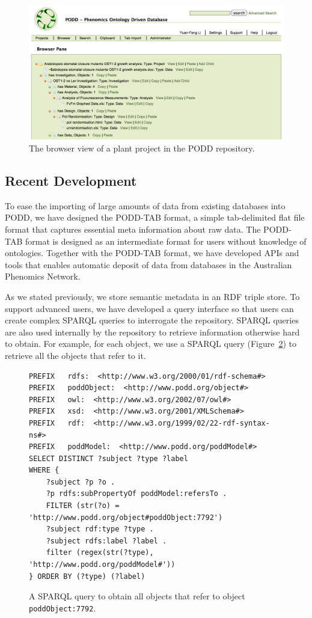 \documentclass[preprint,12pt]{elsarticle}
\begin{document}
\begin{figure}[htb]
\centering
\includegraphics[width=120mm]{browser.png}
\vspace{-8pt} 
\caption{The browser view of a plant project in the PODD repository.}\label{fig:browser}
\end{figure}

\subsection{Recent Development}
To ease the importing of large amounts of data from existing databases into PODD, we have designed the PODD-TAB format, a simple tab-delimited flat file format that captures essential meta information about raw data. The PODD-TAB format is designed as an intermediate format for users without knowledge of ontologies. Together with the PODD-TAB format, we have developed APIs and tools that enables automatic deposit of data from databases in the Australian Phenomics Network. 

As we stated previously, we store semantic metadata in an RDF triple store. To support advanced users, we have developed a query interface so that users can create complex SPARQL queries to interrogate the repository. SPARQL queries are also used internally by the repository to retrieve information otherwise hard to obtain. For example, for each object, we use a SPARQL query (Figure~\ref{fig:query}) to retrieve all the objects that refer to it. 

\begin{figure}[htb]
\footnotesize\centering
\begin{minipage}{.9\textwidth}
\begin{verbatim}
PREFIX   rdfs:  <http://www.w3.org/2000/01/rdf-schema#>
PREFIX   poddObject:  <http://www.podd.org/object#>
PREFIX   owl:  <http://www.w3.org/2002/07/owl#>
PREFIX   xsd:  <http://www.w3.org/2001/XMLSchema#>
PREFIX   rdf:  <http://www.w3.org/1999/02/22-rdf-syntax-ns#>
PREFIX   poddModel:  <http://www.podd.org/poddModel#>
SELECT DISTINCT ?subject ?type ?label 
WHERE {
    ?subject ?p ?o .
    ?p rdfs:subPropertyOf poddModel:refersTo .
    FILTER (str(?o) = 'http://www.podd.org/object#poddObject:7792')
    ?subject rdf:type ?type .
    ?subject rdfs:label ?label .
    filter (regex(str(?type), 'http://www.podd.org/poddModel#'))
} ORDER BY (?type) (?label)
\end{verbatim}
\end{minipage}
\caption{A SPARQL query to obtain all objects that refer to object \texttt{poddObject:7792}.}\label{fig:query}
\end{figure}
\end{document}

